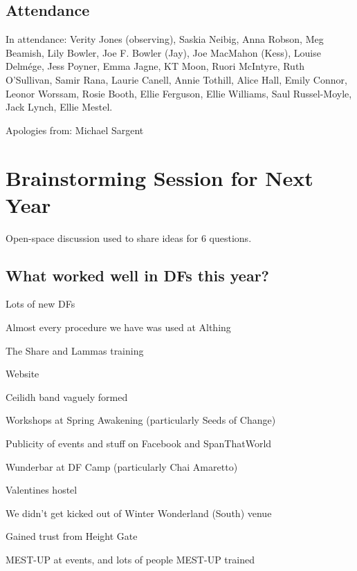\documentclass[a4paper, 12pt]{article}
\begin{document}
\subsection{Attendance}
In attendance: Verity Jones (observing), Saskia Neibig, Anna Robson, Meg Beamish, Lily Bowler, Joe F. Bowler (Jay), Joe MacMahon (Kess), Louise Delmége, Jess Poyner, Emma Jagne, KT Moon, Ruori McIntyre, Ruth O'Sullivan, Samir Rana, Laurie Canell, Annie Tothill, Alice Hall, Emily Connor, Leonor Worssam, Rosie Booth, Ellie Ferguson, Ellie Williams, Saul Russel-Moyle, Jack Lynch, Ellie Mestel.

Apologies from: Michael Sargent

\section{Brainstorming Session for Next Year}
Open-space discussion used to share ideas for 6 questions.
\subsection{What worked well in DFs this year?}
\begin{itemize*}
	\item Lots of new DFs
	\item Almost every procedure we have was used at Althing
	\item The Share and Lammas training
	\item Website
	\item Ceilidh band vaguely formed
	\item Workshops at Spring Awakening (particularly Seeds of Change)
	\item Publicity of events and stuff on Facebook and SpanThatWorld
	\item Wunderbar at DF Camp (particularly Chai Amaretto)
	\item Valentines hostel
	\item We didn't get kicked out of Winter Wonderland (South) venue
	\item Gained trust from Height Gate
	\item MEST-UP at events, and lots of people MEST-UP trained
\end{itemize*}
\end{document}
